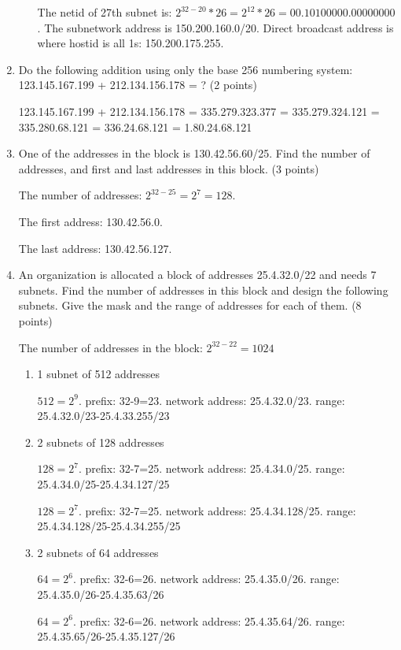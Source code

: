 \documentclass{article}
\begin{document}
\begin{enumerate}
\begin{enumerate}
    The netid of 27th subnet is: $2^{32-20}*26=2^{12}*26=00.10100000.00000000$. The subnetwork address is 150.200.160.0/20. Direct broadcast address is where hostid is all 1s: 150.200.175.255.
  \end{enumerate}

  \item Do the following addition using only the base 256 numbering system: 123.145.167.199 + 212.134.156.178 = ? (2 points)

  123.145.167.199 + 212.134.156.178 = 335.279.323.377 = 335.279.324.121 = 335.280.68.121 = 336.24.68.121 = 1.80.24.68.121

  \item One of the addresses in the block is 130.42.56.60/25. Find the number of addresses, and first and last addresses in this block. (3 points)

  The number of addresses: $2^{32-25}=2^7=128$.

  The first address: 130.42.56.0.

  The last address: 130.42.56.127.

  \item An organization is allocated a block of addresses 25.4.32.0/22 and needs 7 subnets.
  Find the number of addresses in this block and design the following subnets.
  Give the mask and the range of addresses for each of them. (8 points)

  The number of addresses in the block: $2^{32-22}=1024$
  \begin{enumerate}
    \item 1 subnet of 512 addresses

    $512=2^{9}$. prefix: 32-9=23. network address: 25.4.32.0/23. range: 25.4.32.0/23-25.4.33.255/23

    \item 2 subnets of 128 addresses

    $128=2^{7}$. prefix: 32-7=25. network address: 25.4.34.0/25. range: 25.4.34.0/25-25.4.34.127/25

    $128=2^{7}$. prefix: 32-7=25. network address: 25.4.34.128/25. range: 25.4.34.128/25-25.4.34.255/25

    \item 2 subnets of 64 addresses

    $64=2^{6}$. prefix: 32-6=26. network address: 25.4.35.0/26. range: 25.4.35.0/26-25.4.35.63/26

    $64=2^{6}$. prefix: 32-6=26. network address: 25.4.35.64/26. range: 25.4.35.65/26-25.4.35.127/26


\end{enumerate}
\end{enumerate}
\end{document}
